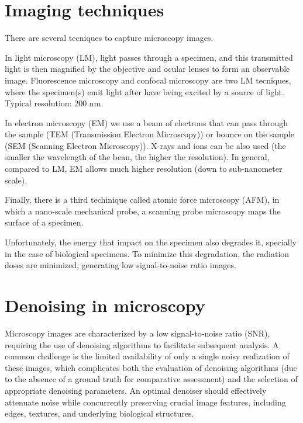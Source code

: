 
\section{Imaging techniques}

There are several tecniques to capture microscopy images.

In light microscopy (LM), light passes through a specimen, and this
transmitted light is then magnified by the objective and ocular lenses
to form an observable image. Fluorescence microscopy and confocal
microscopy are two LM tecniques, where the specimen(s) emit light
after have being excited by a source of light. Typical resolution: 200
nm.

In electron microscopy (EM) we use a beam of electrons that can pass
through the sample (TEM (Transmission Electron Microscopy)) or bounce
on the sample (SEM (Scanning Electron Microscopy)). X-rays and ions
can be also used (the smaller the wavelength of the bean, the higher
the resolution). In general, compared to LM, EM allows much higher
resolution (down to sub-nanometer scale).

Finally, there is a third techinique called atomic force microscopy
(AFM), in which a nano-scale mechanical probe, a scanning probe
microscopy maps the surface of a specimen.

Unfortunately, the energy that impact on the specimen also degrades
it, specially in the case of biological specimens. To minimize this
degradation, the radiation doses are minimized, generating low
signal-to-noise ratio images.


\section{Denoising in microscopy}


Microscopy images are characterized by a low signal-to-noise ratio
(SNR), requiring the use of denoising algorithms to facilitate
subsequent analysis. A common challenge is the limited availability of
only a single noisy realization of these images, which complicates
both the evaluation of denoising algorithms (due to the absence of a
ground truth for comparative assessment) and the selection of
appropriate denoising parameters. An optimal denoiser should
effectively attenuate noise while concurrently preserving crucial
image features, including edges, textures, and underlying biological
structures.

